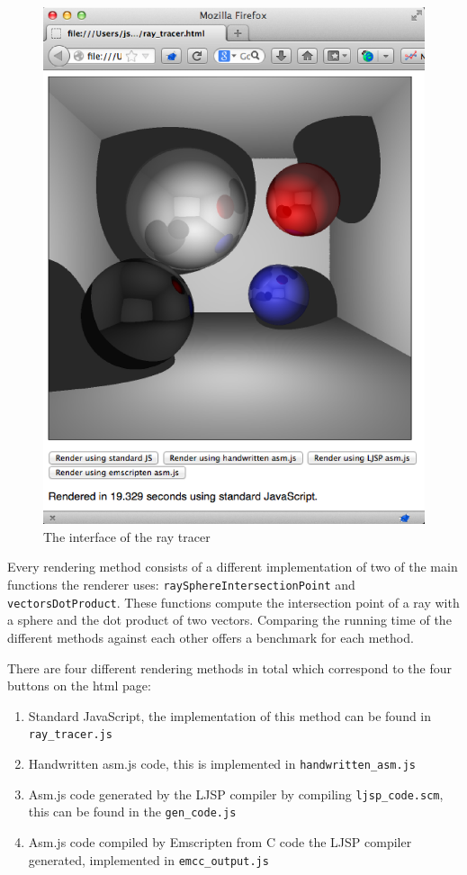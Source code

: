 \documentclass[11pt]{report}
\begin{document}
\begin{figure}[p]
\includegraphics[scale=0.65]{raytracinginterface.eps}
\caption{The interface of the ray tracer}
\label{raytracinginterface}
\end{figure}

Every rendering method consists of a different implementation of two of the main functions the renderer uses: \texttt{raySphereIntersectionPoint} and \texttt{vectorsDotProduct}. These functions compute the intersection point of a ray with a sphere and the dot product of two vectors. Comparing the running time of the different methods against each other offers a benchmark for each method.

There are four different rendering methods in total which correspond to the four buttons on the html page:

\begin{enumerate}
\item Standard JavaScript, the implementation of this method can be found in \texttt{ray_tracer.js}
\item Handwritten asm.js code, this is implemented in \texttt{handwritten_asm.js}
\item Asm.js code generated by the LJSP compiler by compiling \texttt{ljsp_code.scm}, this can be found in the \texttt{gen_code.js}
\item Asm.js code compiled by Emscripten from C code the LJSP compiler generated, implemented in \texttt{emcc_output.js}
\end{enumerate}
\end{document}
